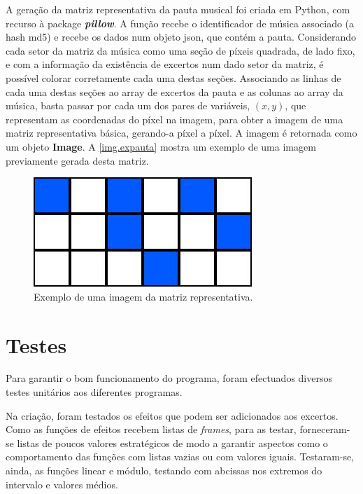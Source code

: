 \documentclass{report}
\begin{document}
A geração da matriz representativa da pauta musical foi criada em Python, com recurso à package \textbf{\textit{pillow}}. A função recebe o identificador de música associado (a hash \ac{md5}) e recebe os dados num objeto \ac{json}, que contém a pauta. Considerando cada setor da matriz da música como uma seção de píxeis quadrada, de lado fixo, e com a informação da existência de excertos num dado setor da matriz, é possível colorar corretamente cada uma destas seções. Associando as linhas de cada uma destas seções ao array de excertos da pauta e as colunas ao array da música, basta passar por cada um dos pares de variáveis, $(x, y)$, que representam as coordenadas do píxel na imagem, para obter a imagem de uma matriz representativa básica, gerando-a píxel a píxel. A imagem é retornada como um objeto \textbf{Image}.\newline
A \autoref{img.expauta} mostra um exemplo de uma imagem previamente gerada desta matriz.

\begin{figure}[H]
\centering
\includegraphics[scale=0.9]{pauta.jpg}
\caption{Exemplo de uma imagem da matriz representativa.}
\label{img.expauta}
\end{figure}

\chapter{Testes}
\label{chap.tests}

Para garantir o bom funcionamento do programa, foram efectuados diversos testes unitários aos diferentes programas.

Na criação, foram testados os efeitos que podem ser adicionados aos excertos. Como as funções de efeitos recebem listas de \textit{frames}, para as testar, forneceram-se listas de poucos valores estratégicos de modo a garantir aspectos como o comportamento das funções com listas vazias ou com valores iguais. Testaram-se, ainda, as funções linear e módulo, testando com abcissas nos extremos do intervalo e valores médios.
\end{document}
